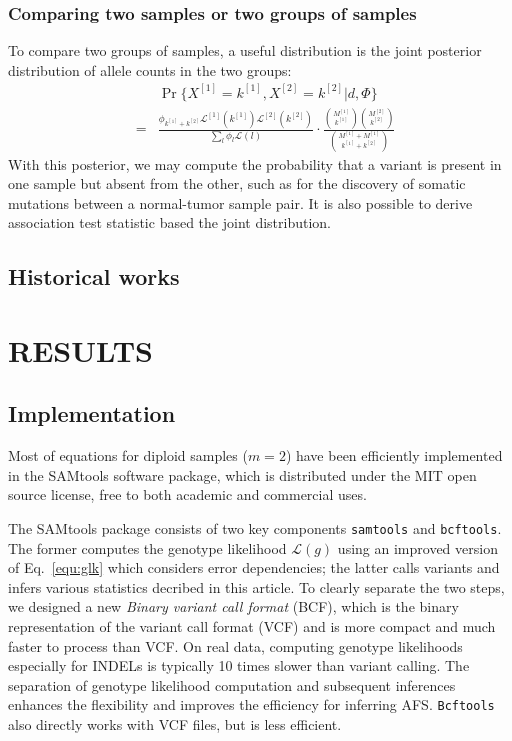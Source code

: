 \documentclass{bioinfo}
\begin{document}
\begin{methods}
\subsubsection{Comparing two samples or two groups of samples}
To compare two groups of samples, a useful distribution is the joint posterior distribution
of allele counts in the two groups:
\begin{eqnarray*}
&&\Pr\{X^{[1]}=k^{[1]},X^{[2]}=k^{[2]}|d,\Phi\}\\
&=&\frac{\phi_{k^{[1]}+k^{[2]}}\mathcal{L}^{[1]}(k^{[1]})\mathcal{L}^{[2]}(k^{[2]})}{\sum_l\phi_l\mathcal{L}(l)}
\cdot\frac{\binom{M^{[1]}}{k^{[1]}}\binom{M^{[2]}}{k^{[2]}}}{\binom{M^{[1]}+M^{[1]}}{k^{[1]}+k^{[2]}}}
\end{eqnarray*}
With this posterior, we may compute the probability that a variant is
present in one sample but absent from the other, such as for the discovery
of somatic mutations between a normal-tumor sample pair. It is also possible to derive association test
statistic based the joint distribution.

\subsection{Historical works}
\end{methods}

\section{RESULTS}
\subsection{Implementation}
Most of equations for diploid samples ($m=2$) have been efficiently implemented
in the SAMtools software package, which is distributed under the MIT open source license,
free to both academic and commercial uses.

The SAMtools package consists of two key components {\tt samtools} and {\tt bcftools}.
The former computes the genotype likelihood $\mathcal{L}(g)$ using an improved version of
Eq.~\eqref{equ:glk} which considers error dependencies; the latter calls variants
and infers various statistics decribed in this article. To clearly separate the two steps,
we designed a new \emph{Binary variant call format} (BCF), which is the binary representation
of the variant call format (VCF) and is more compact and much faster to process than VCF.
On real data, computing genotype likelihoods especially for INDELs is typically 10 times slower than
variant calling. The separation of genotype likelihood computation and subsequent
inferences enhances the flexibility and improves the efficiency for inferring
AFS. {\tt Bcftools} also directly works with VCF files, but is less efficient.
\end{document}
